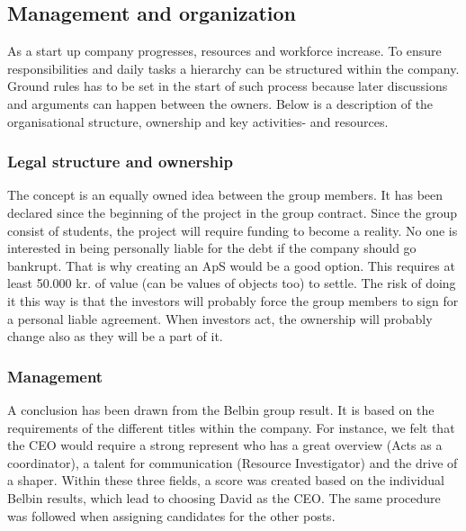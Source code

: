 \subsection{Management and organization}
As a start up company progresses, resources and workforce increase. To ensure responsibilities and daily tasks a hierarchy can be structured within the company. Ground rules has to be set in the start of such process because later discussions and arguments can happen between the owners. Below is a description of the organisational structure, ownership and key activities- and resources.

\subsubsection{Legal structure and ownership}
The concept is an equally owned idea between the group members. It has been declared since the beginning of the project in the group contract.
Since the group consist of students, the project will require funding to become a reality. No one is interested in being personally liable for the debt if the company should go bankrupt. That is why creating an ApS would be a good option. This requires at least 50.000 kr. of value (can be values of objects too) to settle. The risk of doing it this way is that the investors will probably force the group members to sign for a personal liable agreement. 
When investors act, the ownership will probably change also as they will be a part of it.

\subsubsection{Management}
A conclusion has been drawn from the Belbin group result. It is based on the requirements of the different titles within the company.  For instance, we felt that the CEO would require a strong represent who has a great overview (Acts as a coordinator), a talent for communication (Resource Investigator) and the drive of a shaper. Within these three fields, a score was created based on the individual Belbin results, which lead to choosing David as the CEO. 
The same procedure was followed when assigning candidates for the other posts. 


